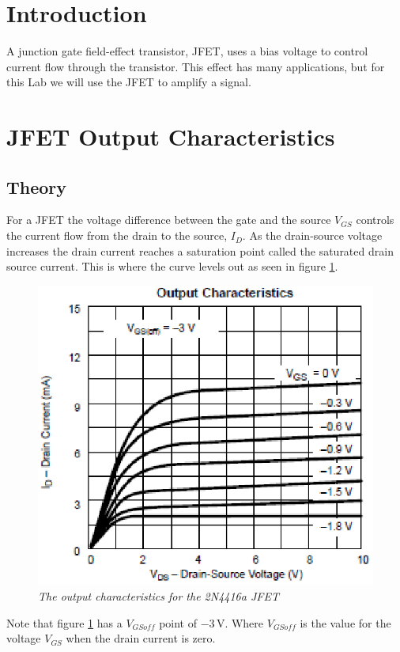 \documentclass[11pt]{article}
\numberwithin{equation}{section}
\numberwithin{figure}{section}
\numberwithin{table}{section}
\newcommand{\unit}[1]{\ensuremath{\, \mathrm{#1}}}
\begin{document}


\section{Introduction}
A junction gate field-effect transistor, JFET, uses a bias voltage to control current flow through the transistor. This effect has many applications, but for this Lab we will use the JFET to amplify a signal.

\section{JFET Output Characteristics}
\subsection{Theory}
For a JFET the voltage difference between the gate and the source $V_{GS}$ controls the current flow from the drain to the source, $I_D$. As the drain-source voltage increases the drain current reaches a saturation point called the saturated drain source current. This is where the curve levels out as seen in figure \ref{JFEToutput}.
\begin{figure}[h]
\centering
\includegraphics[scale=0.60]{JFEToutput.eps}
\caption{\textit{The output characteristics for the 2N4416a JFET}}
\label{JFEToutput}
\end{figure} 
Note that figure \ref{JFEToutput} has a $V_{GSoff}$ point of $-3\unit{V}$. Where $V_{GSoff}$ is the value for the voltage $V_{GS}$ when the drain current is zero.
\end{document}
